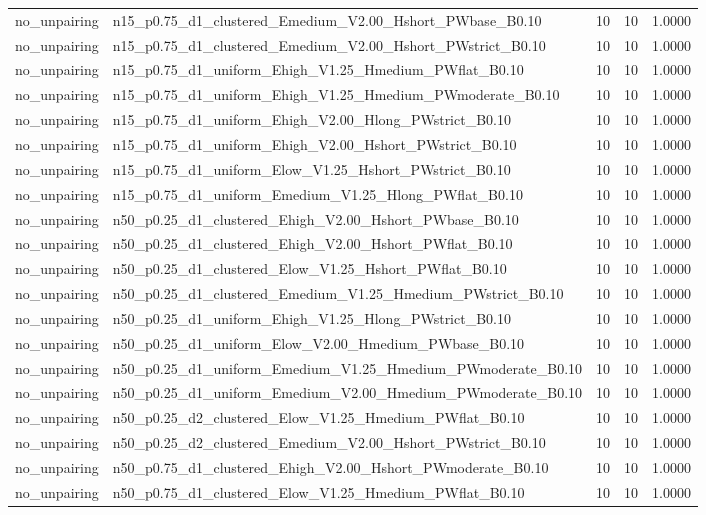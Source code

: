 \begin{tabular}{llrrr}
no_unpairing & n15_p0.75_d1_clustered_Emedium_V2.00_Hshort_PWbase_B0.10 & 10 & 10 & 1.0000 \\
no_unpairing & n15_p0.75_d1_clustered_Emedium_V2.00_Hshort_PWstrict_B0.10 & 10 & 10 & 1.0000 \\
no_unpairing & n15_p0.75_d1_uniform_Ehigh_V1.25_Hmedium_PWflat_B0.10 & 10 & 10 & 1.0000 \\
no_unpairing & n15_p0.75_d1_uniform_Ehigh_V1.25_Hmedium_PWmoderate_B0.10 & 10 & 10 & 1.0000 \\
no_unpairing & n15_p0.75_d1_uniform_Ehigh_V2.00_Hlong_PWstrict_B0.10 & 10 & 10 & 1.0000 \\
no_unpairing & n15_p0.75_d1_uniform_Ehigh_V2.00_Hshort_PWstrict_B0.10 & 10 & 10 & 1.0000 \\
no_unpairing & n15_p0.75_d1_uniform_Elow_V1.25_Hshort_PWstrict_B0.10 & 10 & 10 & 1.0000 \\
no_unpairing & n15_p0.75_d1_uniform_Emedium_V1.25_Hlong_PWflat_B0.10 & 10 & 10 & 1.0000 \\
no_unpairing & n50_p0.25_d1_clustered_Ehigh_V2.00_Hshort_PWbase_B0.10 & 10 & 10 & 1.0000 \\
no_unpairing & n50_p0.25_d1_clustered_Ehigh_V2.00_Hshort_PWflat_B0.10 & 10 & 10 & 1.0000 \\
no_unpairing & n50_p0.25_d1_clustered_Elow_V1.25_Hshort_PWflat_B0.10 & 10 & 10 & 1.0000 \\
no_unpairing & n50_p0.25_d1_clustered_Emedium_V1.25_Hmedium_PWstrict_B0.10 & 10 & 10 & 1.0000 \\
no_unpairing & n50_p0.25_d1_uniform_Ehigh_V1.25_Hlong_PWstrict_B0.10 & 10 & 10 & 1.0000 \\
no_unpairing & n50_p0.25_d1_uniform_Elow_V2.00_Hmedium_PWbase_B0.10 & 10 & 10 & 1.0000 \\
no_unpairing & n50_p0.25_d1_uniform_Emedium_V1.25_Hmedium_PWmoderate_B0.10 & 10 & 10 & 1.0000 \\
no_unpairing & n50_p0.25_d1_uniform_Emedium_V2.00_Hmedium_PWmoderate_B0.10 & 10 & 10 & 1.0000 \\
no_unpairing & n50_p0.25_d2_clustered_Elow_V1.25_Hmedium_PWflat_B0.10 & 10 & 10 & 1.0000 \\
no_unpairing & n50_p0.25_d2_clustered_Emedium_V2.00_Hshort_PWstrict_B0.10 & 10 & 10 & 1.0000 \\
no_unpairing & n50_p0.75_d1_clustered_Ehigh_V2.00_Hshort_PWmoderate_B0.10 & 10 & 10 & 1.0000 \\
no_unpairing & n50_p0.75_d1_clustered_Elow_V1.25_Hmedium_PWflat_B0.10 & 10 & 10 & 1.0000 \\

\end{tabular}
